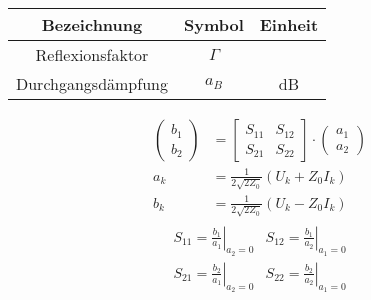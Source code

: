 \begin{center}
\begin{tabular}{ccc} \toprule
Bezeichnung & Symbol & Einheit \\ \midrule
Reflexionsfaktor & $\Gamma$ &  \\
Durchgangsdämpfung & $a_B$ & \si{\dB} \\
\bottomrule
\end{tabular}
\end{center}
%

\begin{center}
\begin{tikzpicture}[scale=0.6, every node/.style={scale=1}]

\end{tikzpicture}
\end{center}

\begin{align*}
\left( \begin{array}{c}
b_1 \\ 
b_2
\end{array}
\right) &= \left[
\begin{array}{cc}
S_{11} & S_{12} \\ 
S_{21} & S_{22}
\end{array}
\right] \cdot \left(
\begin{array}{c}
a_1 \\ 
a_2
\end{array} \right) \\
a_k &= \frac{1}{2\sqrt{2Z_0}}\left( U_k + Z_0 I_k\right) \\
b_k &= \frac{1}{2\sqrt{2Z_0}}\left( U_k - Z_0 I_k\right)
\end{align*}
\renewcommand{\arraystretch}{1.6}
\begin{align*}
\begin{array}{cc}
S_{11} = \left.\frac{b_1}{a_1} \right\vert_{a_2 = 0} & S_{12} = \left.\frac{b_1}{a_2} \right\vert_{a_1 = 0} \\ 
S_{21} = \left.\frac{b_2}{a_1} \right\vert_{a_2 = 0} & S_{22} = \left.\frac{b_2}{a_2} \right\vert_{a_1 = 0}
\end{array}
\end{align*}
\renewcommand{\arraystretch}{1}

